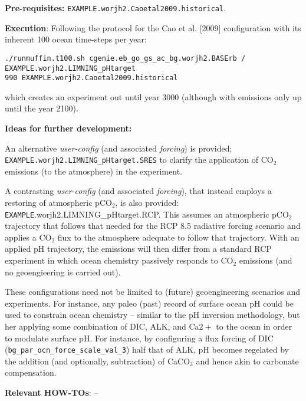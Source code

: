 \documentclass[10pt,twoside]{article}
\begin{document}
\noindent \textbf{Pre-requisites:} \texttt{EXAMPLE.worjh2.Caoetal2009.historical}.

\noindent \textbf{Execution}: Following the protocol for the Cao et al. [2009] configuration with its inherent 100 ocean time-steps per year:
\vspace{-10pt}\small\begin{verbatim}./runmuffin.t100.sh cgenie.eb_go_gs_ac_bg.worjh2.BASErb / EXAMPLE.worjh2.LIMNING_pHtarget 
990 EXAMPLE.worjh2.Caoetal2009.historical\end{verbatim}\normalsize\vspace{-10pt}
which creates an experiment out until year 3000 (although with emissions only up until the year 2100).

\noindent \textbf{Ideas for further development:}

An alternative \textit{user-config} (and associated \textit{forcing}) is provided; \texttt{EXAMPLE.worjh2.LIMNING\_pHtarget.SRES} to clarify the application of CO\(_{2}\) emissions (to the atmosphere) in the experiment.

A contrasting \textit{user-config} (and associated \textit{forcing}), that instead employs a restoring of atmospheric pCO\(_{2}\), is also provided: \texttt{EXAMPLE}.worjh2.LIMNING\_pHtarget.RCP. This assumes an atmospheric pCO\(_{2}\) trajectory that follows that needed for the RCP 8.5 radiative forcing scenario and applies a CO\(_{2}\) flux to the atmosphere adequate to follow that trajectory. With an applied pH trajectory, the emissions will then differ from a standard RCP experiment in which ocean chemistry passively responds to CO\(_{2}\) emissions (and no geoengieering is carried out).

These configurations need not be limited to (future) geoengineering scenarios and experiments. For instance, any paleo (past) record of surface ocean pH could be used to constrain ocean chemistry -- similar to the pH inversion methodology, but her applying some combination of DIC, ALK, and Ca\(2+\) to the ocean in order to modulate surface pH. For instance, by configuring a flux forcing of DIC (\texttt{bg\_par\_ocn\_force\_scale\_val\_3}) half that of ALK, pH becomes regelated by the addition (and optionally, subtraction) of CaCO\(_{3}\) and hence akin to carbonate compensation.

\noindent \textbf{Relevant HOW-TOs}: --

\end{document}
